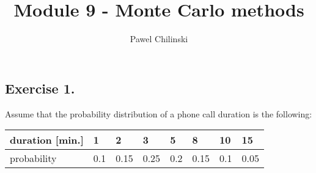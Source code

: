 \documentclass[a4paper]{article}
\title{Module 9 - Monte Carlo methods}
\author{Pawel Chilinski}
\begin{document}

\maketitle

\subsection{Exercise 1.} Assume that the probability distribution of a phone
call duration is the following:

\begin{table}[H]
\begin{center}
  \begin{tabular}{ |l | l |l| l| l | l |l|l|}
  \hline
    duration [min.] & 1 & 2 & 3 & 5 & 8 & 10 & 15 \\ \hline
    probability & 0.1 & 0.15 & 0.25 & 0.2 & 0.15 & 0.1& 0.05\\ \hline    
  \end{tabular}
\end{center}
\end{table}
\end{document}
